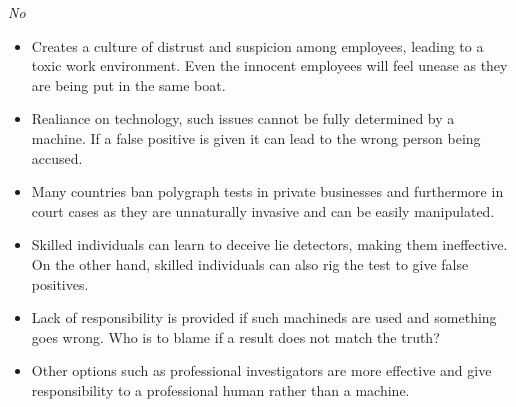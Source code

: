 \documentclass{article}
\begin{document}
\textit{No}
\begin{itemize}
    \item Creates a culture of distrust and suspicion among employees, leading to a toxic work environment. Even the innocent employees will feel unease as they are being put in the same boat.
    \item Realiance on technology, such issues cannot be fully determined by a machine. If a false positive is given it can lead to the wrong person being accused.
    \item Many countries ban polygraph tests in private businesses and furthermore in court cases as they are unnaturally invasive and can be easily manipulated.
    \item Skilled individuals can learn to deceive lie detectors, making them ineffective. On the other hand, skilled individuals can also rig the test to give false positives.
    \item Lack of responsibility is provided if such machineds are used and something goes wrong. Who is to blame if a result does not match the truth?
    \item Other options such as professional investigators are more effective and give responsibility to a professional human rather than a machine.
\end{itemize}
\end{document}
